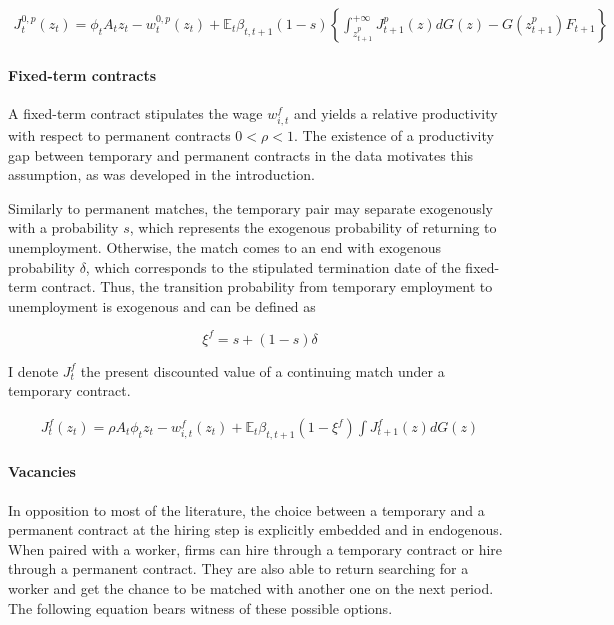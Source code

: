 \documentclass[a4paper]{article}
\begin{document}
\begin{align*}
J_{t}^{0,p} \left( z_{t} \right) = \phi_t A_t z_{t} - w_{t}^{0,p} \left( z_t \right) + \mathbb{E}_{t}  \beta_{t,t+1} (1-s) \left\{ \int_{z_{t+1}^p}^{+\infty} J_{t+1}^{p} \left( z \right) dG(z) - G\left(z_{t+1}^p\right) F_{t+1} \right\}
\end{align*}

\paragraph{Fixed-term contracts} A fixed-term contract stipulates the wage $w_{i,t}^{f}$ and yields a relative productivity with respect to permanent contracts $0 < \rho < 1$. The existence of a productivity gap between temporary and permanent contracts in the data motivates this assumption, as was developed in the introduction.

Similarly to permanent matches, the temporary pair may separate exogenously with a probability $s$, which represents the exogenous probability of returning to unemployment. Otherwise, the match comes to an end with exogenous probability $\delta$, which corresponds to the stipulated termination date of the fixed-term contract. Thus, the transition probability from temporary employment to unemployment is exogenous and can be defined as

\begin{equation*}
\xi^f = s + (1-s)\delta
\end{equation*}

I denote $J_t^f$ the present discounted value of a continuing match under a temporary contract.

\begin{align*}
J_{t}^f \left( z_t \right) = \rho A_t \phi_t z_t - w_{i,t}^{f} \left( z_t \right) + \mathbb{E}_{t} \beta_{t,t+1} \left( 1-\xi^f \right)  \int J_{t+1}^{f} \left( z \right) dG(z)
\end{align*}

\paragraph{Vacancies} In opposition to most of the literature, the choice between a temporary and a permanent contract at the hiring step is explicitly embedded and in endogenous. When paired with a worker, firms can hire through a temporary contract or hire through a permanent contract. They are also able to return searching for a worker and get the chance to be matched with another one on the next period. The following equation bears witness of these possible options.
\end{document}
